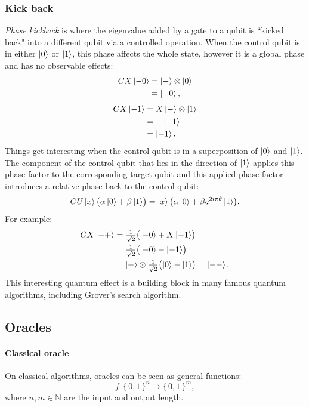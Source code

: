 \documentclass{article}
\newcommand*{\Nset}{\mathbb{N}}
\begin{document}
\subsubsection{Kick back}
\emph{Phase kickback} is where the eigenvalue added by a gate to a qubit is
``kicked back" into a different qubit via a controlled operation.
When the control qubit is in either $\ket{0}$ or $\ket{1}$, this phase affects
the whole state, however it is a global phase and has no observable effects:
\begin{align*}
  CX \ket{-0}
  & = \ket{-} \otimes \ket{0} \\
  & = \ket{-0},
\end{align*}
\begin{align*}
  CX \ket{-1}
  & = X\ket{-} \otimes \ket{1} \\
  & = -\ket{-1} \\
  & = \ket{-1}.
\end{align*}
Things get interesting when the control qubit is in a superposition of
$\ket{0}$ and $\ket{1}$.
The component of the control qubit that lies in the direction of  $\ket{1}$
applies this phase factor to the corresponding target qubit and this applied
phase factor introduces a relative phase back to the control qubit:
\[
CU \ket{x} \bigl(\alpha \ket{0} + \beta \ket{1} \bigr) =
\ket{x} \bigl(\alpha \ket{0} + \beta e^{2 i \pi \theta} \ket{1} \bigr).
\]
For example:
\begin{align*}
  CX \ket{-+}
  & = \tfrac{1}{\sqrt{2}} \bigl( \ket{-0} + X\ket{-1} \bigr) \\
  & = \tfrac{1}{\sqrt{2}} \bigl( \ket{-0} - \ket{-1} \bigr) \\
  & = \ket{-} \otimes \tfrac{1}{\sqrt{2}} \bigl( \ket{0} - \ket{1} \bigr) =
      \ket{--}.\\
\end{align*}
This interesting quantum effect is a building block in many
famous quantum algorithms, including Grover's search algorithm.

\subsection{Oracles}

\paragraph{Classical oracle}
On classical algorithms, oracles can be seen as general functions:
\[
  f: \{\, 0, 1 \,\}^n \mapsto \{\, 0, 1 \,\}^m,
\]
where $n, m \in \Nset$ are the input and output length.
\end{document}
